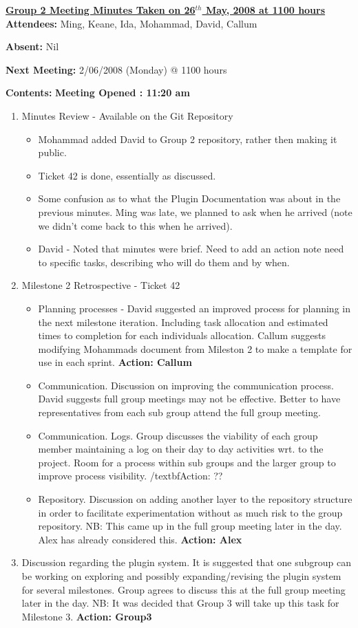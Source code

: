 \documentclass{letter}
\begin{document}
 
{\large \textbf{\underline{Group 2 Meeting Minutes Taken on 26$^{th}$ May, 2008 at 1100 hours}}}\\
 
\textbf{Attendees:} Ming, Keane, Ida, Mohammad, David, Callum
 
\textbf{Absent:} Nil
 
\textbf{Next Meeting:} 2/06/2008 (Monday) @ 1100 hours
 
\textbf{Contents:}
 \textbf{Meeting Opened : 11:20 am }
\begin{enumerate}
\item Minutes Review - Available on the Git Repository
	\begin{itemize}
	\item Mohammad added David to Group 2 repository, rather then making it public.
	\item Ticket 42 is done, essentially as discussed.
	\item Some confusion as to what the Plugin Documentation was about in the previous minutes. Ming was late, we planned to ask when he arrived (note we didn't come back to this when he arrived).
	\item David - Noted that minutes were brief. Need to add an action note need to specific tasks, describing who will do them and by when.
	\end{itemize}
\item Milestone 2 Retrospective - Ticket 42
	\begin{itemize}
	\item Planning processes - David suggested an improved process for planning in
	the next milestone iteration. Including task allocation and estimated times to completion for each
	individuals allocation. Callum suggests modifying Mohammads document from
	Mileston 2 to make a template for use in each sprint. \textbf{Action: Callum}
	\item Communication. Discussion on improving the communication process. David
	suggests full group meetings may not be effective. Better to have
	representatives from each sub group attend the full group meeting.
	\item Communication. Logs. Group discusses the viability of each group member
	maintaining a log on their day to day activities wrt. to the project. Room for
	a process within sub groups and the larger group to improve process
	visibility. /textbf{Action: ??}
	\item Repository. Discussion on adding another layer to the repository
	structure in order to facilitate experimentation without as much risk to the
	group repository. NB: This came up in the full group meeting later in the day.
	Alex has already considered this. \textbf{Action: Alex}
    \end{itemize}
\item Discussion regarding the plugin system. It is suggested that one
	subgroup can be working on exploring and possibly expanding/revising the plugin
	system for several milestones. Group agrees to discuss this at the full group
	meeting later in the day. NB: It was decided that Group 3 will take up this
	task for Milestone 3. \textbf{Action: Group3}
\end{enumerate}
\end{document}

